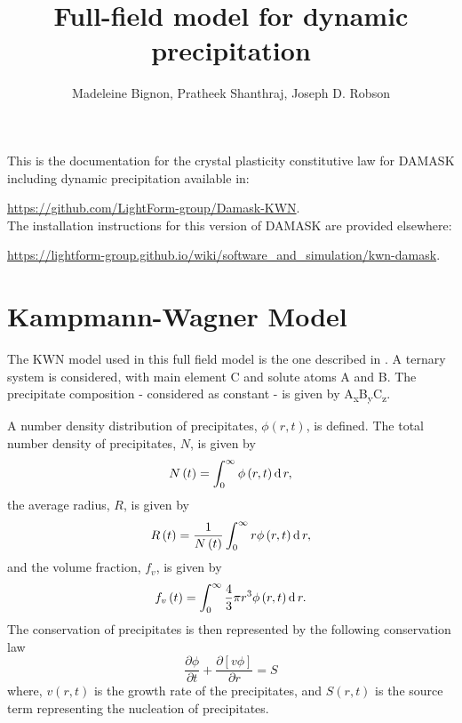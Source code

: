 \documentclass[11pt]{scrartcl}
\newcommand{\inc}[1]{\ensuremath{\text d\,{#1}}}
\newcommand{\partialder}[2]{\ensuremath{\frac{\partial{#1}}{\partial{#2}}}}
\begin{document}
\author{Madeleine Bignon, Pratheek Shanthraj, Joseph D. Robson}
\title{Full-field model for dynamic precipitation}
\maketitle

\noindent This is the documentation for the crystal plasticity constitutive law for DAMASK including dynamic precipitation available in:
 
\noindent  \url{https://github.com/LightForm-group/Damask-KWN}.  \\
 
\noindent The installation instructions for this version of DAMASK are provided elsewhere:
 
  \noindent  \url{https://lightform-group.github.io/wiki/software_and_simulation/kwn-damask}.

\section{Kampmann-Wagner Model}

The KWN model used in this full field model is the one described in \cite{Bignon2022}. A ternary system is considered, with main element C and solute atoms A and B. The precipitate composition - considered as constant - is given by \hypertarget{stoichiometry} {A\textsubscript{x}B\textsubscript{y}C\textsubscript{z}}.

A number density distribution of precipitates, $\phi\left(r,t\right)$, is defined. 
The total number density of precipitates, $N$, is given by
%
\begin{equation}
\label{eq: totaldensity}
N\left(t\right) = \int_{0}^{\infty} \phi\left(r,t\right) \inc{r},
\end{equation}
%
the average radius, $R$, is given by
%
\begin{equation}
\label{eq: avgradius}
R\left(t\right) = \frac{1}{N\left(t\right)}\int_{0}^{\infty} r \phi\left(r,t\right) \inc{r},
\end{equation}
%
and the volume fraction, $f_{v}$, is given by
%
\begin{equation}
\label{eq: volfrac}
f_{v}\left(t\right) =\int_{0}^{\infty} \frac{4}{3} \pi r^3 \phi\left(r,t\right) \inc{r}.
\end{equation}
%
The conservation of precipitates is then represented by the following conservation law
%
\begin{equation}
\label{eq: conservation}
\partialder{\phi}{t}+ \partialder{\left[v \phi\right]}{r} = S
\end{equation}
%
where, $v\left(r,t\right)$ is the growth rate of the precipitates, and $S\left(r,t\right)$ is the source term representing the nucleation of precipitates.
\end{document}
